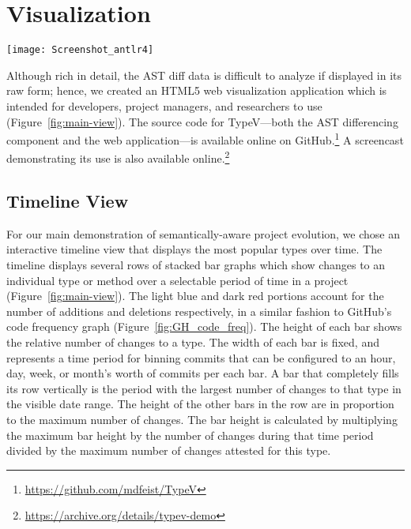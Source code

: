 \section{Visualization}



\label{sec:viz}

\begin{figure*}[!ht]
\centering
\texttt{[image: Screenshot\_antlr4]}
\caption{Screenshot showing the main view for TypeV. The data being displayed is from the ANTLR4 repository. Light blue bars \additionsbox{10pt} indicate \textbf{additions}; dark red bars \deletionsbox{10pt} indicate \textbf{deletions}.}
\label{fig:main-view}
\end{figure*}

Although rich in detail, the AST diff data is difficult to analyze if displayed in its raw form; hence, we created an HTML5 web visualization application which is intended for developers, project managers, and researchers to use (Figure~\ref{fig:main-view}). The source code for TypeV---both the AST differencing component and the web application---is available online on GitHub.\footnote{\url{https://github.com/mdfeist/TypeV}} A screencast demonstrating its use is also available online.\footnote{\url{https://archive.org/details/typev-demo}}

\subsection{Timeline View}
For our main demonstration of semantically-aware project evolution, we chose an interactive timeline view that displays the most popular types over time. The timeline displays several rows of stacked bar graphs which show changes to an individual type or method over a selectable period of time in a project (Figure~\ref{fig:main-view}). The light blue \additionsbox{10pt} and dark red \deletionsbox{10pt} portions account for the number of additions and deletions respectively, in a similar fashion to GitHub's code frequency graph (Figure~\ref{fig:GH_code_freq}). The height of each bar shows the relative number of changes to a type. The width of each bar is fixed, and represents a time period for binning commits that can be configured to an hour, day, week, or month's worth of commits per each bar. A bar that completely fills its row vertically is the period with the largest number of changes to that type in the visible date range. The height of the other bars in the row are in proportion to the maximum number of changes. The bar height is calculated by multiplying the maximum bar height by the number of changes during that time period divided by the maximum number of changes attested for this type.

